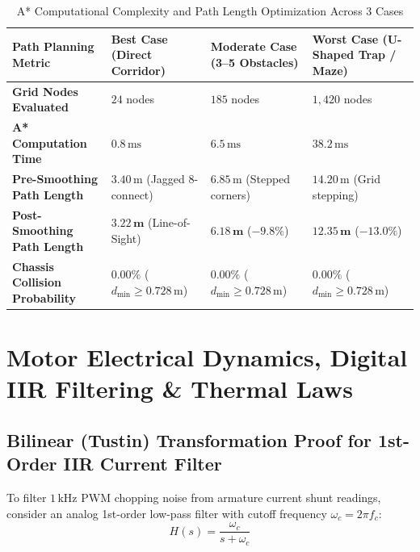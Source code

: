 \documentclass[11pt, a4paper]{article}
\begin{document}
\begin{table}[H]
\centering
\small
\begin{tabularx}{\textwidth}{L{3.8cm} Y Y Y}
\toprule
\textbf{Path Planning Metric} & \textbf{Best Case (Direct Corridor)} & \textbf{Moderate Case (3--5 Obstacles)} & \textbf{Worst Case (U-Shaped Trap / Maze)} \\
\midrule
\textbf{Grid Nodes Evaluated} & $24$ nodes & $185$ nodes & $1,420$ nodes \\
\textbf{A* Computation Time} & $0.8\,\text{ms}$ & $6.5\,\text{ms}$ & $38.2\,\text{ms}$ \\
\textbf{Pre-Smoothing Path Length} & $3.40\,\text{m}$ (Jagged 8-connect) & $6.85\,\text{m}$ (Stepped corners) & $14.20\,\text{m}$ (Grid stepping) \\
\textbf{Post-Smoothing Path Length} & $\mathbf{3.22\,\text{m}}$ (Line-of-Sight) & $\mathbf{6.18\,\text{m}}$ ($-9.8\%$) & $\mathbf{12.35\,\text{m}}$ ($-13.0\%$) \\
\textbf{Chassis Collision Probability} & $\mathbf{0.00\%}$ ($d_{\min} \ge 0.728\,\text{m}$) & $\mathbf{0.00\%}$ ($d_{\min} \ge 0.728\,\text{m}$) & $\mathbf{0.00\%}$ ($d_{\min} \ge 0.728\,\text{m}$) \\
\bottomrule
\end{tabularx}
\caption{A* Computational Complexity and Path Length Optimization Across 3 Cases}
\label{tab:planning_error}
\end{table}

\newpage
\section{Motor Electrical Dynamics, Digital IIR Filtering \& Thermal Laws}

\subsection{Bilinear (Tustin) Transformation Proof for 1st-Order IIR Current Filter}
To filter $1\,\text{kHz}$ PWM chopping noise from armature current shunt readings, consider an analog 1st-order low-pass filter with cutoff frequency $\omega_c = 2\pi f_c$:
\begin{equation}
    H(s) = \frac{\omega_c}{s + \omega_c}
\end{equation}
\end{document}
